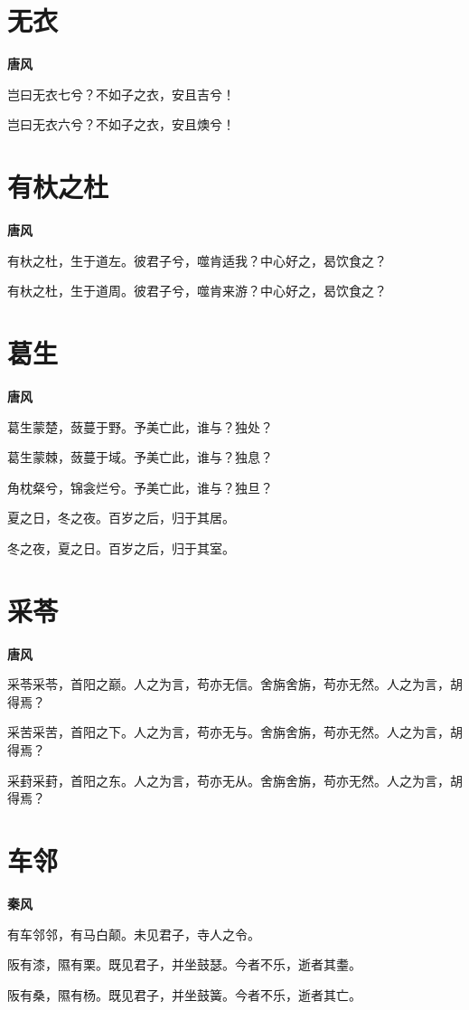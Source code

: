 \documentclass[12pt,a4paper]{ctexbook}
\begin{document}
\section{无衣}
\textbf{唐风}\par\vspace{0.5em}
岂曰无衣七兮？不如子之衣，安且吉兮！\par
岂曰无衣六兮？不如子之衣，安且燠兮！\par

\section{有杕之杜}
\textbf{唐风}\par\vspace{0.5em}
有杕之杜，生于道左。彼君子兮，噬肯适我？中心好之，曷饮食之？\par
有杕之杜，生于道周。彼君子兮，噬肯来游？中心好之，曷饮食之？\par

\section{葛生}
\textbf{唐风}\par\vspace{0.5em}
葛生蒙楚，蔹蔓于野。予美亡此，谁与？独处？\par
葛生蒙棘，蔹蔓于域。予美亡此，谁与？独息？\par
角枕粲兮，锦衾烂兮。予美亡此，谁与？独旦？\par
夏之日，冬之夜。百岁之后，归于其居。\par
冬之夜，夏之日。百岁之后，归于其室。\par

\section{采苓}
\textbf{唐风}\par\vspace{0.5em}
采苓采苓，首阳之巅。人之为言，苟亦无信。舍旃舍旃，苟亦无然。人之为言，胡得焉？\par
采苦采苦，首阳之下。人之为言，苟亦无与。舍旃舍旃，苟亦无然。人之为言，胡得焉？\par
采葑采葑，首阳之东。人之为言，苟亦无从。舍旃舍旃，苟亦无然。人之为言，胡得焉？\par

\section{车邻}
\textbf{秦风}\par\vspace{0.5em}
有车邻邻，有马白颠。未见君子，寺人之令。\par
阪有漆，隰有栗。既见君子，并坐鼓瑟。今者不乐，逝者其耋。\par
阪有桑，隰有杨。既见君子，并坐鼓簧。今者不乐，逝者其亡。\par
\end{document}
